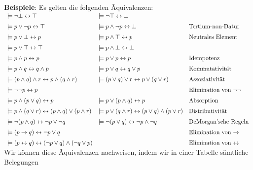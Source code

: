 \noindent
\textbf{Beispiele}:  Es gelten die folgenden Ãquivalenzen: \\[0.3cm]
\hspace*{0.3cm} 
$\begin{array}{lll}
\models \neg \bot \leftrightarrow \top & \models \neg \top \leftrightarrow \bot &  \\[0.2cm]
 \models p \vee   \neg p \leftrightarrow \top & \models p \wedge \neg p \leftrightarrow \bot & \mbox{Tertium-non-Datur} \\[0.2cm]
 \models p \vee   \bot \leftrightarrow p & \models p \wedge \top  \leftrightarrow p & \mbox{Neutrales Element}\\[0.2cm]
 \models p \vee   \top  \leftrightarrow \top & \models p \wedge \bot \leftrightarrow \bot &  \\[0.2cm]
 \models p \wedge p \leftrightarrow p  & \models p \vee p \leftrightarrow p &  \mbox{Idempotenz} \\[0.2cm]
 \models p \wedge q \leftrightarrow q \wedge p & \models p \vee   q \leftrightarrow q \vee p & \mbox{Kommutativit\"{a}t} \\[0.2cm]
 \models (p \wedge q) \wedge r \leftrightarrow p \wedge (q \wedge r) & \models (p \vee   q) \vee r \leftrightarrow p \vee   (q \vee r)  &
 \mbox{Assoziativit\"{a}t} \\[0.2cm]
 \models \neg \neg p \leftrightarrow p & & \mbox{Elimination von $\neg \neg$} \\[0.2cm]
 \models p \wedge (p \vee q)   \leftrightarrow p & \models p \vee   (p \wedge q) \leftrightarrow p &  \mbox{Absorption} \\[0.2cm]
 \models p \wedge (q \vee r)   \leftrightarrow (p \wedge q) \vee   (p \wedge r) & 
 \models p \vee   (q \wedge r) \leftrightarrow (p \vee q)   \wedge (p \vee   r) & \mbox{Distributivit\"{a}t} \\[0.2cm]
 \models \neg (p \wedge q) \leftrightarrow  \neg p \vee   \neg q &  \models \neg (p \vee   q) \leftrightarrow  \neg p \wedge \neg q &
 \mbox{DeMorgan'sche Regeln}  \\[0.2cm]
 \models (p \rightarrow q) \leftrightarrow \neg p \vee q & &  \mbox{Elimination von $\rightarrow$} \\[0.2cm]
 \models (p \leftrightarrow q) \leftrightarrow (\neg p \vee q) \wedge (\neg q \vee p) & & \mbox{Elimination von $\leftrightarrow$}
\end{array}$ \\[0.3cm]
Wir k\"{o}nnen diese Ãquivalenzen nachweisen, indem wir in einer Tabelle s\"{a}mtliche Belegungen
